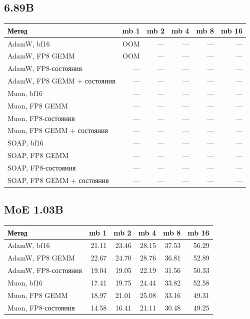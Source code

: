 \documentclass[10pt]{article}
\begin{document}
\subsection{6.89B}
\begin{center}
\small
\begin{tabular}{lrrrrr}
\toprule
\textbf{Метод} & \textbf{mb 1} & \textbf{mb 2} & \textbf{mb 4} & \textbf{mb 8} & \textbf{mb 16} \\
\midrule
AdamW, bf16 & \textcolor{oomgray}{OOM} & --- & --- & --- & --- \\
AdamW, FP8 GEMM & \textcolor{oomgray}{OOM} & --- & --- & --- & --- \\
AdamW, FP8-состояния & --- & --- & --- & --- & --- \\
AdamW, FP8 GEMM + состояния & --- & --- & --- & --- & --- \\
Muon, bf16 & --- & --- & --- & --- & --- \\
Muon, FP8 GEMM & --- & --- & --- & --- & --- \\
Muon, FP8-состояния & --- & --- & --- & --- & --- \\
Muon, FP8 GEMM + состояния & --- & --- & --- & --- & --- \\
SOAP, bf16 & --- & --- & --- & --- & --- \\
SOAP, FP8 GEMM & --- & --- & --- & --- & --- \\
SOAP, FP8-состояния & --- & --- & --- & --- & --- \\
SOAP, FP8 GEMM + состояния & --- & --- & --- & --- & --- \\
\bottomrule
\end{tabular}
\end{center}
\subsection{MoE 1.03B}
\begin{center}
\small
\begin{tabular}{lrrrrr}
\toprule
\textbf{Метод} & \textbf{mb 1} & \textbf{mb 2} & \textbf{mb 4} & \textbf{mb 8} & \textbf{mb 16} \\
\midrule
AdamW, bf16 & 21.11 & 23.46 & 28.15 & 37.53 & 56.29 \\
AdamW, FP8 GEMM & 22.67 & 24.70 & 28.76 & 36.81 & 52.89 \\
AdamW, FP8-состояния & 19.04 & 19.05 & 22.19 & 31.56 & 50.33 \\
Muon, bf16 & 17.41 & 19.75 & 24.44 & 33.82 & 52.58 \\
Muon, FP8 GEMM & 18.97 & 21.01 & 25.08 & 33.16 & 49.31 \\
Muon, FP8-состояния & 14.58 & 16.41 & 21.11 & 30.48 & 49.25 \\
\bottomrule
\end{tabular}
\end{center}
\end{document}
